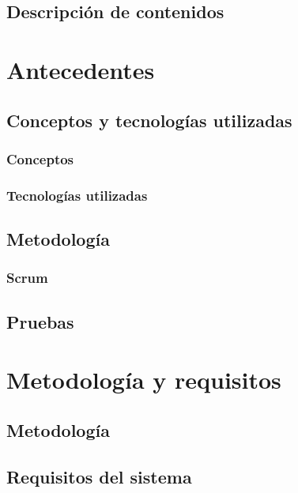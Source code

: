 \documentclass{iccmemoria}
\begin{document}
	\section{Descripción de contenidos}
	

\chapter{Antecedentes}
	\section{Conceptos y tecnologías utilizadas}
		\subsection{Conceptos}
		\subsection{Tecnologías utilizadas}

	\section{Metodología}
		\subsection{Scrum}
		
	
	\section{Pruebas}
	

\chapter{Metodología y requisitos}
	\section{Metodología}
	

	\section{Requisitos del sistema}
	
\end{document}
